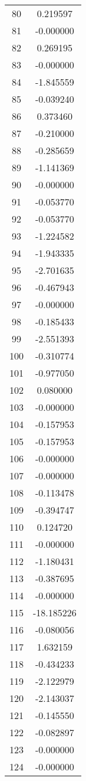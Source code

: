\documentclass[12pt]{article}
\begin{document}
\begin{longtable}{@{}cc@{}}
80 & 0.219597 \\
81 & -0.000000 \\
82 & 0.269195 \\
83 & -0.000000 \\
84 & -1.845559 \\
85 & -0.039240 \\
86 & 0.373460 \\
87 & -0.210000 \\
88 & -0.285659 \\
89 & -1.141369 \\
90 & -0.000000 \\
91 & -0.053770 \\
92 & -0.053770 \\
93 & -1.224582 \\
94 & -1.943335 \\
95 & -2.701635 \\
96 & -0.467943 \\
97 & -0.000000 \\
98 & -0.185433 \\
99 & -2.551393 \\
100 & -0.310774 \\
101 & -0.977050 \\
102 & 0.080000 \\
103 & -0.000000 \\
104 & -0.157953 \\
105 & -0.157953 \\
106 & -0.000000 \\
107 & -0.000000 \\
108 & -0.113478 \\
109 & -0.394747 \\
110 & 0.124720 \\
111 & -0.000000 \\
112 & -1.180431 \\
113 & -0.387695 \\
114 & -0.000000 \\
115 & -18.185226 \\
116 & -0.080056 \\
117 & 1.632159 \\
118 & -0.434233 \\
119 & -2.122979 \\
120 & -2.143037 \\
121 & -0.145550 \\
122 & -0.082897 \\
123 & -0.000000 \\
124 & -0.000000 \\

\end{longtable}
\end{document}
